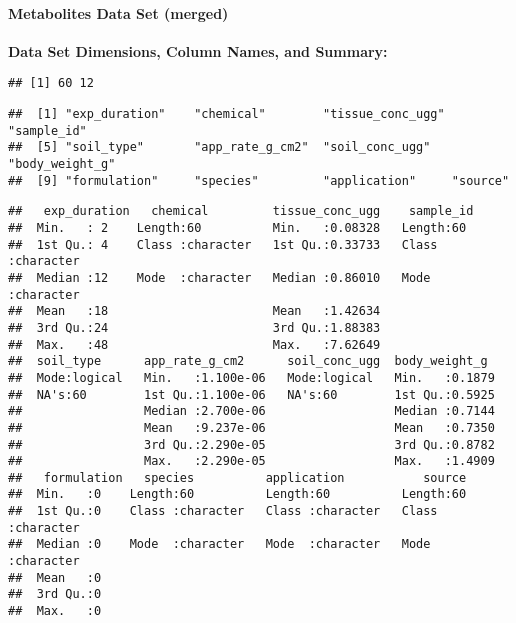 \documentclass[
]{article}
\begin{document}
\hypertarget{metabolites-data-set-merged}{%
\paragraph{\texorpdfstring{\textbf{Metabolites Data Set
(merged)}}{Metabolites Data Set (merged)}}\label{metabolites-data-set-merged}}

\textbf{Data Set Dimensions, Column Names, and Summary:}

\begin{verbatim}
## [1] 60 12
\end{verbatim}

\begin{verbatim}
##  [1] "exp_duration"    "chemical"        "tissue_conc_ugg" "sample_id"      
##  [5] "soil_type"       "app_rate_g_cm2"  "soil_conc_ugg"   "body_weight_g"  
##  [9] "formulation"     "species"         "application"     "source"
\end{verbatim}

\begin{verbatim}
##   exp_duration   chemical         tissue_conc_ugg    sample_id        
##  Min.   : 2    Length:60          Min.   :0.08328   Length:60         
##  1st Qu.: 4    Class :character   1st Qu.:0.33733   Class :character  
##  Median :12    Mode  :character   Median :0.86010   Mode  :character  
##  Mean   :18                       Mean   :1.42634                     
##  3rd Qu.:24                       3rd Qu.:1.88383                     
##  Max.   :48                       Max.   :7.62649                     
##  soil_type      app_rate_g_cm2      soil_conc_ugg  body_weight_g   
##  Mode:logical   Min.   :1.100e-06   Mode:logical   Min.   :0.1879  
##  NA's:60        1st Qu.:1.100e-06   NA's:60        1st Qu.:0.5925  
##                 Median :2.700e-06                  Median :0.7144  
##                 Mean   :9.237e-06                  Mean   :0.7350  
##                 3rd Qu.:2.290e-05                  3rd Qu.:0.8782  
##                 Max.   :2.290e-05                  Max.   :1.4909  
##   formulation   species          application           source         
##  Min.   :0    Length:60          Length:60          Length:60         
##  1st Qu.:0    Class :character   Class :character   Class :character  
##  Median :0    Mode  :character   Mode  :character   Mode  :character  
##  Mean   :0                                                            
##  3rd Qu.:0                                                            
##  Max.   :0
\end{verbatim}
\end{document}
